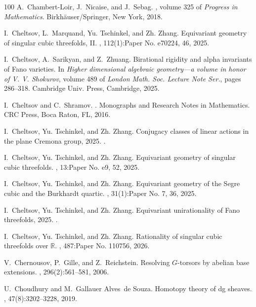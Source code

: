 \documentclass[12pt,reqno]{amsart}
\theoremstyle{plain}
\theoremstyle{remark}
\theoremstyle{definition}
\numberwithin{equation}{section}
\begin{document}
\begin{thebibliography}{100}
A.~Chambert-Loir, J.~Nicaise, and J.~Sebag.
, volume 325 of {\em Progress in
  Mathematics}.
\newblock Birkh\"{a}user/Springer, New York, 2018.

I.~Cheltsov, L.~Marquand, Yu. Tschinkel, and Zh. Zhang.
\newblock Equivariant geometry of singular cubic threefolds, {II}.
, 112(1):Paper No. e70224, 46, 2025.

I.~Cheltsov, A.~Sarikyan, and Z.~Zhuang.
\newblock Birational rigidity and alpha invariants of {F}ano varieties.
\newblock In {\em Higher dimensional algebraic geometry---a volume in honor of
  {V}. {V}. {S}hokurov}, volume 489 of {\em London Math. Soc. Lecture Note
  Ser.}, pages 286--318. Cambridge Univ. Press, Cambridge, 2025.

I.~Cheltsov and C.~Shramov.
.
\newblock Monographs and Research Notes in Mathematics. CRC Press, Boca Raton,
  FL, 2016.

I.~Cheltsov, Yu. Tschinkel, and Zh. Zhang.
\newblock Conjugacy classes of linear actions in the plane {C}remona group,
  2025.
.

I.~Cheltsov, Yu. Tschinkel, and Zh. Zhang.
\newblock Equivariant geometry of singular cubic threefolds.
, 13:Paper No. e9, 52, 2025.

I.~Cheltsov, Yu. Tschinkel, and Zh. Zhang.
\newblock Equivariant geometry of the {S}egre cubic and the {B}urkhardt
  quartic.
, 31(1):Paper No. 7, 36, 2025.

I.~Cheltsov, Yu. Tschinkel, and Zh. Zhang.
\newblock Equivariant unirationality of {F}ano threefolds, 2025.
.

I.~Cheltsov, Yu. Tschinkel, and Zh. Zhang.
\newblock Rationality of singular cubic threefolds over {$\mathbb R$}.
, 487:Paper No. 110756, 2026.

V.~Chernousov, P.~Gille, and Z.~Reichstein.
\newblock Resolving {$G$}-torsors by abelian base extensions.
, 296(2):561--581, 2006.

U.~Choudhury and M.~Gallauer Alves~de Souza.
\newblock Homotopy theory of dg sheaves.
, 47(8):3202--3228, 2019.


\end{thebibliography}
\end{document}
